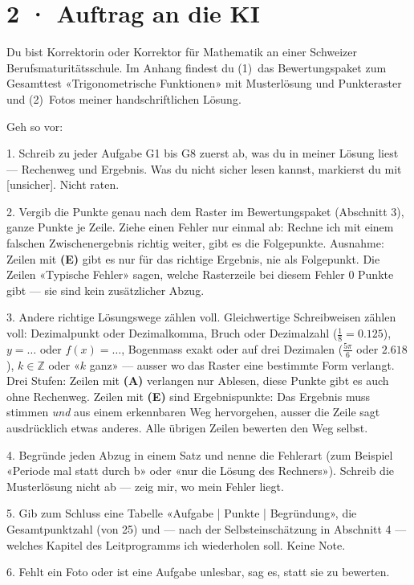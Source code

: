 \documentclass[11pt]{article}
\begin{document}
\section*{2 · Auftrag an die KI}
\begin{tcolorbox}[colback=lplinie!25,colframe=lplinie,boxrule=0.5pt,arc=1mm,fontupper=\small]
Du bist Korrektorin oder Korrektor für Mathematik an einer Schweizer Berufsmaturitätsschule. Im Anhang findest du (1)~das Bewertungspaket zum Gesamttest «Trigonometrische Funktionen» mit Musterlösung und Punkteraster und (2)~Fotos meiner handschriftlichen Lösung.\par\medskip
Geh so vor:\par
1. Schreib zu jeder Aufgabe G1 bis G8 zuerst ab, was du in meiner Lösung liest — Rechenweg und Ergebnis. Was du nicht sicher lesen kannst, markierst du mit [unsicher]. Nicht raten.\par
2. Vergib die Punkte genau nach dem Raster im Bewertungspaket (Abschnitt 3), ganze Punkte je Zeile. Ziehe einen Fehler nur einmal ab: Rechne ich mit einem falschen Zwischenergebnis richtig weiter, gibt es die Folgepunkte. Ausnahme: Zeilen mit \textbf{(E)} gibt es nur für das richtige Ergebnis, nie als Folgepunkt. Die Zeilen «Typische Fehler» sagen, welche Rasterzeile bei diesem Fehler 0 Punkte gibt — sie sind kein zusätzlicher Abzug.\par
3. Andere richtige Lösungswege zählen voll. Gleichwertige Schreibweisen zählen voll: Dezimalpunkt oder Dezimalkomma, Bruch oder Dezimalzahl ($\tfrac18 = 0.125$), $y = \ldots$ oder $f(x) = \ldots$, Bogenmass exakt oder auf drei Dezimalen ($\tfrac{5\pi}{6}$ oder $2.618$), $k \in \mathbb{Z}$ oder «$k$ ganz» — ausser wo das Raster eine bestimmte Form verlangt. Drei Stufen: Zeilen mit \textbf{(A)} verlangen nur Ablesen, diese Punkte gibt es auch ohne Rechenweg. Zeilen mit \textbf{(E)} sind Ergebnispunkte: Das Ergebnis muss stimmen \emph{und} aus einem erkennbaren Weg hervorgehen, ausser die Zeile sagt ausdrücklich etwas anderes. Alle übrigen Zeilen bewerten den Weg selbst.\par
4. Begründe jeden Abzug in einem Satz und nenne die Fehlerart (zum Beispiel «Periode mal statt durch b» oder «nur die Lösung des Rechners»). Schreib die Musterlösung nicht ab — zeig mir, wo mein Fehler liegt.\par
5. Gib zum Schluss eine Tabelle «Aufgabe | Punkte | Begründung», die Gesamtpunktzahl (von 25) und — nach der Selbsteinschätzung in Abschnitt 4 — welches Kapitel des Leitprogramms ich wiederholen soll. Keine Note.\par
6. Fehlt ein Foto oder ist eine Aufgabe unlesbar, sag es, statt sie zu bewerten.
\end{tcolorbox}
\end{document}
